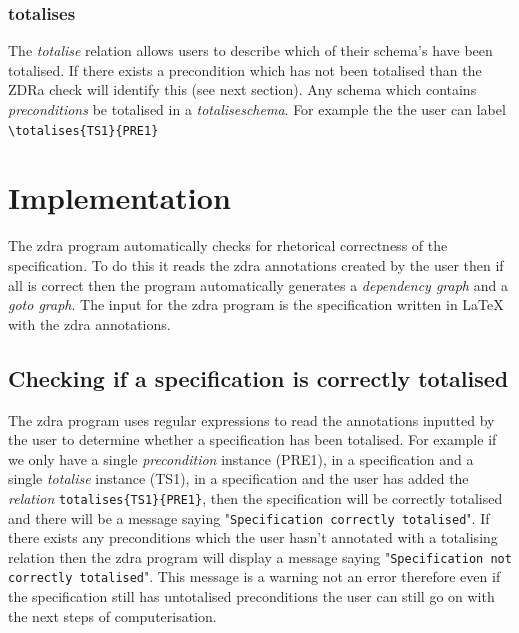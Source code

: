 \subsubsection{totalises}
The \emph{totalise} relation allows users to describe which of their schema's
have been totalised. If there exists a precondition which has not been totalised
than the ZDRa check will identify this (see next section). Any schema which
contains \emph{preconditions} be totalised in a \emph{totaliseschema}. For
example the the user can label \verb|\totalises{TS1}{PRE1}|


\section{Implementation}
\label{sec:zdra_implement}

The \gls{zdra} program automatically checks for rhetorical correctness of the
specification. To do this it reads the \gls{zdra} annotations created by the
user then if all is correct then the program automatically generates a
\emph{dependency graph} and a \emph{goto graph}. The input for the \gls{zdra}
program is the specification written in \LaTeX{} with the \gls{zdra}
annotations.

\subsection{Checking if a specification is correctly totalised}
\label{subsec:correctlytotalised}

The \gls{zdra} program uses regular expressions to read the annotations inputted
by the user to determine whether a specification has been totalised. For example
if we only have a single \emph{precondition} instance (PRE1), in a specification
and a single \emph{totalise} instance (TS1), in a specification and the user has
added the \emph{relation} \verb|totalises{TS1}{PRE1}|, then the specification
will be correctly totalised and there will be a message saying
"\texttt{Specification correctly totalised}". If there exists any preconditions
which the user hasn't annotated with a totalising relation then the \gls{zdra}
program will display a message saying "\texttt{Specification not correctly
totalised}". This message is a warning not an error therefore even if the
specification still has untotalised preconditions the user can still go on with
the next steps of computerisation.

